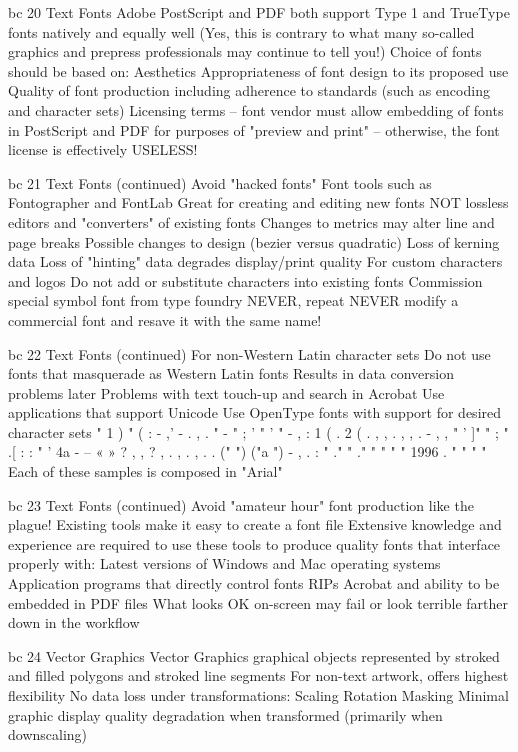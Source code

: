 \documentclass[11pt,a4paper]{article}
\begin{document}
bc 20 Text Fonts Adobe PostScript and PDF both support Type 1 and TrueType fonts natively and equally well (Yes, this is contrary to what many so-called graphics and prepress professionals may continue to tell you!) Choice of fonts should be based on: Aesthetics Appropriateness of font design to its proposed use Quality of font production including adherence to standards (such as encoding and character sets) Licensing terms -- font vendor must allow embedding of fonts in PostScript and PDF for purposes of "preview and print" -- otherwise, the font license is effectively USELESS!

bc 21 Text Fonts (continued) Avoid "hacked fonts" Font tools such as Fontographer and FontLab Great for creating and editing new fonts NOT lossless editors and "converters" of existing fonts Changes to metrics may alter line and page breaks Possible changes to design (bezier versus quadratic) Loss of kerning data Loss of "hinting" data degrades display/print quality For custom characters and logos Do not add or substitute characters into existing fonts Commission special symbol font from type foundry NEVER, repeat NEVER modify a commercial font and resave it with the same name!

bc 22 Text Fonts (continued) For non-Western Latin character sets Do not use fonts that masquerade as Western Latin fonts Results in data conversion problems later Problems with text touch-up and search in Acrobat Use applications that support Unicode Use OpenType fonts with support for desired character sets " 1 ) " ( : - ,' - . , . " - " ; ' " ' " - , : 1 ( . 2 ( . , , . , , . - , , " ' ]" " ; " .[ : : " ' 4a - -- « » ? , , ? , . , . , . . (" ") ("a ") - , . : " ." " ." " " " " 1996 . " " " " Each of these samples is composed in "Arial"

bc 23 Text Fonts (continued) Avoid "amateur hour" font production like the plague! Existing tools make it easy to create a font file Extensive knowledge and experience are required to use these tools to produce quality fonts that interface properly with: Latest versions of Windows and Mac operating systems Application programs that directly control fonts RIPs Acrobat and ability to be embedded in PDF files What looks OK on-screen may fail or look terrible farther down in the workflow

bc 24 Vector Graphics Vector Graphics graphical objects represented by stroked and filled polygons and stroked line segments For non-text artwork, offers highest flexibility No data loss under transformations: Scaling Rotation Masking Minimal graphic display quality degradation when transformed (primarily when downscaling)
\end{document}
